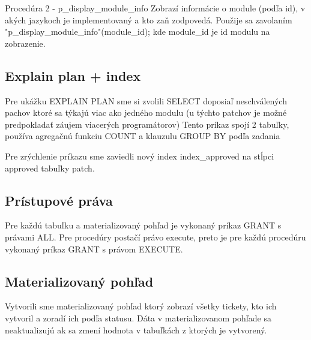 \documentclass[11pt, a4paper]{article}
\begin{document}
    Procedúra 2 - p\_display\_module\_info
    Zobrazí informácie o module (podľa id), v akých jazykoch je implementovaný a kto zaň zodpovedá.
    Použije sa zavolaním "p\_display\_module\_info"(module\_id); kde module\_id je id modulu na zobrazenie.

    \subsection{Explain plan + index}\label{subsec:explain-plan-+-index}

    Pre ukážku EXPLAIN PLAN sme si zvolili SELECT doposiaľ neschválených pachov ktoré sa týkajú viac ako jedného modulu (u týchto patchov je možné predpokladať záujem viacerých programátorov)
    Tento príkaz spojí 2 tabuľky, používa agregačnú funkciu COUNT a klauzulu GROUP BY podľa zadania

    Pre zrýchlenie príkazu sme zaviedli nový index index\_approved na stĺpci approved tabuľky patch.

    \subsection{Prístupové práva}\label{subsec:prístupové-práva}

    Pre každú tabuľku a materializovaný pohľad je vykonaný príkaz GRANT s právami ALL.
    Pre procedúry postačí právo execute, preto je pre každú procedúru vykonaný príkaz GRANT s právom EXECUTE.

    \subsection{Materializovaný pohľad}\label{subsec:materializovaný-pohľad}

    Vytvorili sme materializovaný pohľad ktorý zobrazí všetky tickety, kto ich vytvoril a zoradí ich podľa statusu.
    Dáta v materializovanom pohľade sa neaktualizujú ak sa zmení hodnota v tabuľkách z ktorých je vytvorený.
\end{document}
